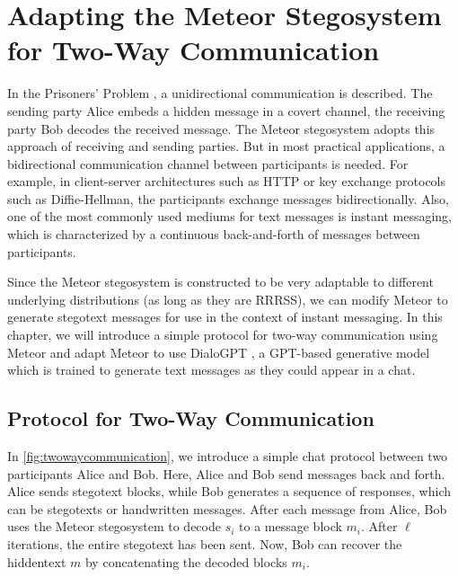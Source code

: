 \chapter{Adapting the Meteor Stegosystem for Two-Way Communication}
\label{chap:twowaycommunication}


In the Prisoners' Problem \cite{Simmons1983}, a unidirectional communication is described.
The sending party Alice embeds a hidden message in a covert channel, the receiving party Bob decodes the received message.
The Meteor stegosystem adopts this approach of receiving and sending parties.
But in most practical applications, a bidirectional communication channel between participants is needed.
For example, in client-server architectures such as HTTP or key exchange protocols such as Diffie-Hellman, the participants exchange messages bidirectionally.
Also, one of the most commonly used mediums for text messages is instant messaging, which is characterized by a continuous back-and-forth of messages between participants.

Since the Meteor stegosystem is constructed to be very adaptable to different underlying distributions (as long as they are RRRSS), we can modify Meteor to generate stegotext messages for use in the context of instant messaging.
In this chapter, we will introduce a simple protocol for two-way communication using Meteor and adapt Meteor to use DialoGPT \cite{Zhang2020}, a GPT-based generative model which is trained to generate text messages as they could appear in a chat.

\section{Protocol for Two-Way Communication}

In \autoref{fig:twowaycommunication}, we introduce a simple chat protocol between two participants Alice and Bob.
Here, Alice and Bob send messages back and forth.
Alice sends stegotext blocks, while Bob generates a sequence of responses, which can be stegotexts or handwritten messages.
After each message from Alice, Bob uses the Meteor stegosystem to decode $s_i$ to a message block $m_i$.
After $\ell$ iterations, the entire stegotext has been sent.
Now, Bob can recover the hiddentext $m$ by concatenating the decoded blocks $m_i$.


